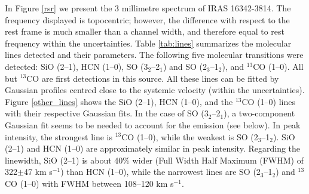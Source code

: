 \documentclass[a4paper,fleqn,usenatbib]{mnras}
\begin{document}
In Figure \ref{rsr} we present the 3 millimetre spectrum of IRAS 16342-3814. The frequency displayed is topocentric; however, the difference with respect to the rest frame is much smaller than a channel width, and therefore equal to rest frequency within the uncertainties. Table \ref{tab:lines} summarizes the molecular lines detected and their parameters. The following five molecular transitions were detected: SiO (2--1), HCN (1--0), SO (3$_2$--2$_1$) and SO (2$_3$--1$_2$), and $^{13}$CO (1--0). All but $^{13}$CO are first detections in this source. All these lines can be fitted by Gaussian profiles centred close to the systemic velocity (within the uncertainties). Figure \ref{other_lines} shows the SiO (2--1), HCN (1--0), and the $^{13}$CO (1--0) lines with their respective Gaussian fits. In the case of SO (3$_2$--2$_1$), a two-component Gaussian fit seems to be needed to account for the emission (see below). In peak intensity, the strongest line is $^{13}$CO (1--0), while the weakest is SO (2$_3$--1$_2$). SiO (2--1) and HCN (1--0) are approximately similar in peak intensity. Regarding the linewidth, SiO (2--1) is about 40\% wider (Full Width Half Maximum (FWHM) of 322$\pm$47 km s$^{-1}$) than HCN (1--0), while the narrowest lines are SO (2$_3$--1$_2$) and $^{13}$CO (1--0) with FWHM between 108--120 km s$^{-1}$. 
\end{document}
